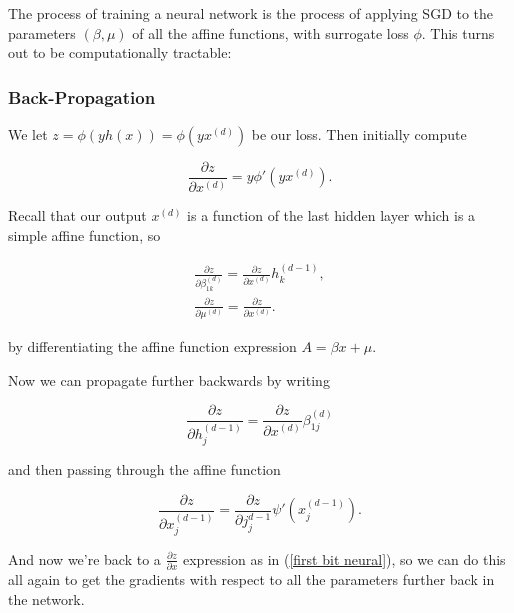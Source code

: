 \documentclass[11pt]{scrartcl}
\begin{document}
The process of training a neural network is the process of applying SGD to the parameters $(\beta,\mu)$ of all the affine functions, with surrogate loss $\phi$. This turns out to be computationally tractable:

\subsubsection{Back-Propagation}

We let $z = \phi(yh(x)) = \phi(y x^{(d)})$ be our loss. Then initially compute

\begin{equation}
    \frac{\partial z}{\partial x^{(d)}} = y \phi ' (yx^{(d)}).
\label{first bit neural}
\end{equation}

Recall that our output $x^{(d)}$ is a function of the last hidden layer which is a simple affine function, so

\begin{align}
    \frac{\partial z}{\partial \beta_{1k}^{(d)}} = \frac{\partial z}{\partial x^{(d)}} h_k^{(d-1)}, \\
    \frac{\partial z}{\partial \mu^{(d)}} = \frac{\partial z}{\partial x^{(d)}}.
\end{align}

by differentiating the affine function expression $A = \beta x + \mu$.

Now we can propagate further backwards by writing

\begin{equation}
    \frac{\partial z}{\partial h_j^{(d-1)}} = \frac{\partial z}{\partial x^{(d)}} \beta_{1j}^{(d)}
\end{equation}

and then passing through the affine function

\begin{equation}
    \frac{\partial z}{\partial x_j^{(d-1)}} = \frac{\partial z}{\partial j_j^{d-1}} \psi ' (x_j^{(d-1)}).
\end{equation}

And now we're back to a $\frac{\partial z}{\partial x}$ expression as in (\ref{first bit neural}), so we can do this all again to get the gradients with respect to all the parameters further back in the network.
\end{document}
